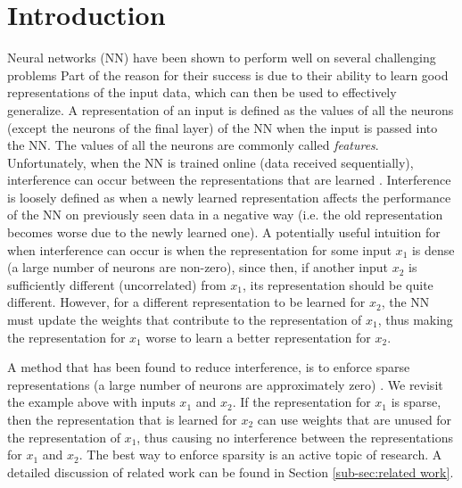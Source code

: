\documentclass{article}
\begin{document}
\section{Introduction} \label{sec:intro}
Neural networks (NN) have been shown to perform well on several challenging problems \cite{brown2020language,krizhevsky2017imagenet,mnih2013playing,silver2017mastering}
Part of the reason for their success is due to their ability to learn good representations of the input data, which can then be used to effectively generalize.
A representation of an input is defined as the values of all the neurons (except the neurons of the final layer) of the NN when the input is passed into the NN.
The values of all the neurons are commonly called \textit{features}.
Unfortunately, when the NN is trained online (data received sequentially), interference can occur between the representations that are learned \cite[]{chandak2019learning,caselles2018continual,madjiheurem2019representation}.
Interference is loosely defined as when a newly learned representation affects the performance of the NN on previously seen data in a negative way (i.e. the old representation becomes worse due to the newly learned one).
A potentially useful intuition for when interference can occur is when the representation for some input $x_1$ is dense (a large number of neurons are non-zero),
since then, if another input $x_2$ is sufficiently different (uncorrelated) from $x_1$, its representation should be quite different.
However, for a different representation to be learned for $x_2$, the NN must update the weights that contribute to the representation of $x_1$, thus making the representation for $x_1$ worse to learn a better representation for $x_2$.

A method that has been found to reduce interference, is to enforce sparse representations (a large number of neurons are approximately zero) \cite[]{liu2019,javed2019,rafati2019learning}.
We revisit the example above with inputs $x_1$ and $x_2$.
If the representation for $x_1$ is sparse, then the representation that is learned for $x_2$ can use weights that are unused for the representation of $x_1$,
thus causing no interference between the representations for $x_1$ and $x_2$.
The best way to enforce sparsity is an active topic of research.
A detailed discussion of related work can be found in Section \ref{sub-sec:related work}.
\end{document}
